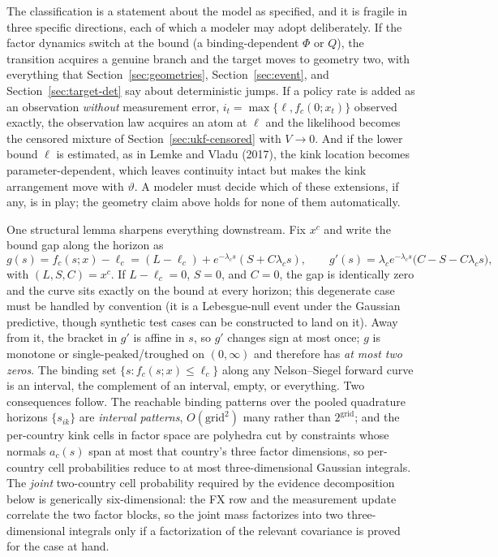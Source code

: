 \documentclass[11pt]{article}
\begin{document}
The classification is a statement about the model as specified, and it
is fragile in three specific directions, each of which a modeler may
adopt deliberately. If the factor dynamics switch at the bound (a
binding-dependent \(\Phi\) or \(Q\)), the transition acquires a
genuine branch and the target moves to geometry two, with everything
that Section~\ref{sec:geometries}, Section~\ref{sec:event}, and Section~\ref{sec:target-det}
say about deterministic jumps. If a policy rate is added as an
observation \emph{without} measurement error,
\(i_t=\max\{\ell,f_c(0;x_t)\}\) observed exactly, the observation law
acquires an atom at \(\ell\) and the likelihood becomes the censored
mixture of Section~\ref{sec:ukf-censored} with \(V\to0\). And if the lower
bound \(\ell\) is estimated, as in Lemke and Vladu (2017), the kink
location becomes parameter-dependent, which leaves continuity intact
but makes the kink arrangement move with \(\vartheta\). A modeler must
decide which of these extensions, if any, is in play; the geometry
claim above holds for none of them automatically.

One structural lemma sharpens everything downstream. Fix \(x^c\) and
write the bound gap along the horizon as
\begin{equation}\label{eq:82}
 g(s)=f_c(s;x)-\ell_c=(L-\ell_c)+e^{-\lambda_c s}(S+C\lambda_c s),
 \qquad
 g'(s)=\lambda_c e^{-\lambda_c s}\bigl(C-S-C\lambda_c s\bigr),
\end{equation}
with \((L,S,C)=x^c\). If \(L-\ell_c=0\), \(S=0\), and \(C=0\), the gap
is identically zero and the curve sits exactly on the bound at every
horizon; this degenerate case must be handled by convention (it is a
Lebesgue-null event under the Gaussian predictive, though synthetic
test cases can be constructed to land on it). Away from it, the bracket
in \(g'\) is affine in \(s\), so \(g'\) changes sign at most once;
\(g\) is monotone or single-peaked/troughed on \((0,\infty)\) and
therefore has \emph{at most two zeros}. The binding set
\(\{s:f_c(s;x)\leq\ell_c\}\) along any Nelson--Siegel forward curve is
an interval, the complement of an interval, empty, or everything. Two
consequences follow. The reachable binding patterns over the pooled
quadrature horizons \(\{s_{ik}\}\) are \emph{interval patterns},
\(O(\text{grid}^2)\) many rather than \(2^{\text{grid}}\); and the
per-country kink cells in factor space are polyhedra cut by constraints
whose normals \(a_c(s)\) span at most that country's three factor
dimensions, so per-country cell probabilities reduce to at most
three-dimensional Gaussian integrals. The \emph{joint} two-country cell
probability required by the evidence decomposition below is generically
six-dimensional: the FX row and the measurement update correlate the
two factor blocks, so the joint mass factorizes into two
three-dimensional integrals only if a factorization of the relevant
covariance is proved for the case at hand.
\end{document}
